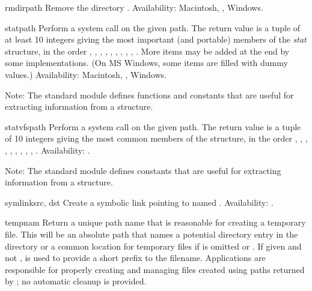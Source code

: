 \begin{funcdesc}{rmdir}{path}
Remove the directory .
Availability: Macintosh, \UNIX{}, Windows.
\end{funcdesc}

\begin{funcdesc}{stat}{path}
Perform a  system call on the given path.  The
return value is a tuple of at least 10 integers giving the most
important (and portable) members of the \emph{stat} structure, in the
order
,
,
,
,
,
,
,
,
,
.
More items may be added at the end by some implementations.
(On MS Windows, some items are filled with dummy values.)
Availability: Macintosh, \UNIX{}, Windows.

Note: The standard module  defines
functions and constants that are useful for extracting information
from a  structure.
\end{funcdesc}

\begin{funcdesc}{statvfs}{path}
Perform a  system call on the given path.  The
return value is a tuple of 10 integers giving the most common
members of the  structure, in the order
,
,
,
,
,
,
,
,
,
.
Availability: \UNIX{}.

Note: The standard module 
defines constants that are useful for extracting information
from a  structure.
\end{funcdesc}

\begin{funcdesc}{symlink}{src, dst}
Create a symbolic link pointing to  named .
Availability: \UNIX{}.
\end{funcdesc}

\begin{funcdesc}{tempnam}{}
Return a unique path name that is reasonable for creating a temporary
file.  This will be an absolute path that names a potential directory
entry in the directory  or a common location for temporary
files if  is omitted or .  If given and not
,  is used to provide a short prefix to the
filename.  Applications are responsible for properly creating and
managing files created using paths returned by ;
no automatic cleanup is provided.
\end{funcdesc}

